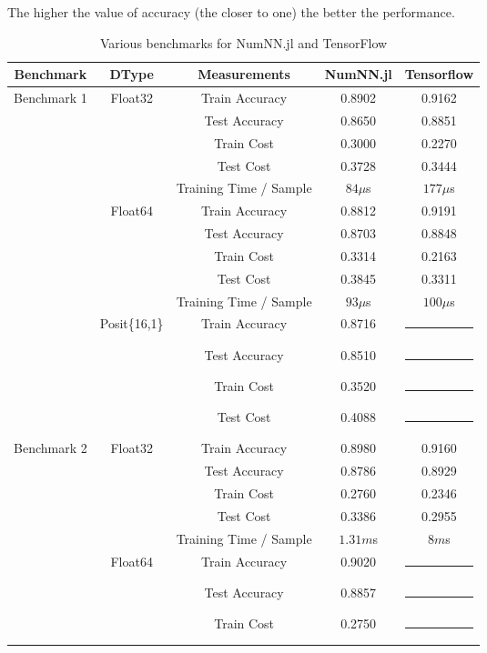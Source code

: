 The higher the value of accuracy (the closer to one) the better the performance.


\begin{table}[!htbp]
	\centering
	\renewcommand{\arraystretch}{1.1}
	\caption{Various benchmarks for NumNN.jl and TensorFlow}\label{tab:bench}
	\begin{tabular}{|c | c | c || c | c |}
		\hline
		Benchmark & DType & Measurements & NumNN.jl & Tensorflow\\\hline\hline
		\multirow{14}{*}{Benchmark 1} & \multirow{5}{*}{Float32} & Train Accuracy & 0.8902 & 0.9162\\
		& & Test Accuracy & 0.8650 & 0.8851\\
		& & Train Cost & 0.3000 & 0.2270\\
		& & Test Cost & 0.3728 & 0.3444\\
		& & Training Time / Sample & $84\mu$s  & $177\mu$s\\\cline{2-5}
		& \multirow{5}{*}{Float64} & Train Accuracy & 0.8812 & 0.9191 \\
		& & Test Accuracy & 0.8703 & 0.8848 \\
		& & Train Cost & 0.3314 & 0.2163 \\
		& & Test Cost & 0.3845 & 0.3311 \\
		& & Training Time / Sample & $93\mu$s & $100\mu$s\\\cline{2-5}
		& \multirow{4}{*}{Posit\{16,1\}} & Train Accuracy & 0.8716 & \rule{5em}{1pt} \\
		& & Test Accuracy & 0.8510 & \rule{5em}{1pt} \\
		& & Train Cost & 0.3520 & \rule{5em}{1pt} \\
		& & Test Cost & 0.4088 & \rule{5em}{1pt} \\\hline
		\multirow{14}{*}{Benchmark 2\footref{batchnorm}} & \multirow{5}{*}{Float32} & Train Accuracy & 0.8980 & 0.9160\\
		& & Test Accuracy & 0.8786 & 0.8929\\
		& & Train Cost & 0.2760 & 0.2346\\
		& & Test Cost & 0.3386 & 0.2955\\
		& & Training Time / Sample & $1.31m$s & $8m$s \\\cline{2-5}
		& \multirow{5}{*}{Float64} & Train Accuracy & 0.9020 & \rule{5em}{1pt} \\
		& & Test Accuracy & 0.8857 & \rule{5em}{1pt} \\
		& & Train Cost & 0.2750 & \rule{5em}{1pt} \\

\end{tabular}
\end{table}
